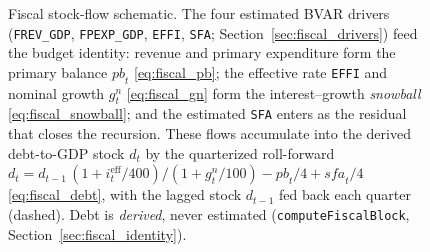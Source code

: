 \documentclass[11pt]{article}
\theoremstyle{definition}
\theoremstyle{remark}
\begin{document}
\begin{figure}[!ht]
\caption{Fiscal stock-flow schematic. The four estimated BVAR drivers
(\texttt{FREV\_GDP}, \texttt{FPEXP\_GDP}, \texttt{EFFI}, \texttt{SFA};
Section~\ref{sec:fiscal_drivers}) feed the budget identity: revenue and
primary expenditure form the primary balance $\mathit{pb}_t$
\eqref{eq:fiscal_pb}; the effective rate \texttt{EFFI} and nominal growth
$g^{n}_t$ \eqref{eq:fiscal_gn} form the interest--growth \emph{snowball}
\eqref{eq:fiscal_snowball}; and the estimated \texttt{SFA} enters as the
residual that closes the recursion. These flows accumulate into the derived
debt-to-GDP stock $d_t$ by the quarterized roll-forward
$d_t = d_{t-1}\,(1{+}i^{\text{eff}}_t/400)/(1{+}g^{n}_t/100)
- \mathit{pb}_t/4 + \mathit{sfa}_t/4$ \eqref{eq:fiscal_debt}, with the lagged
stock $d_{t-1}$ fed back each quarter (dashed). Debt is \emph{derived}, never
estimated (\texttt{computeFiscalBlock}, Section~\ref{sec:fiscal_identity}).}
\label{fig:fiscal}
\end{figure}
\end{document}

